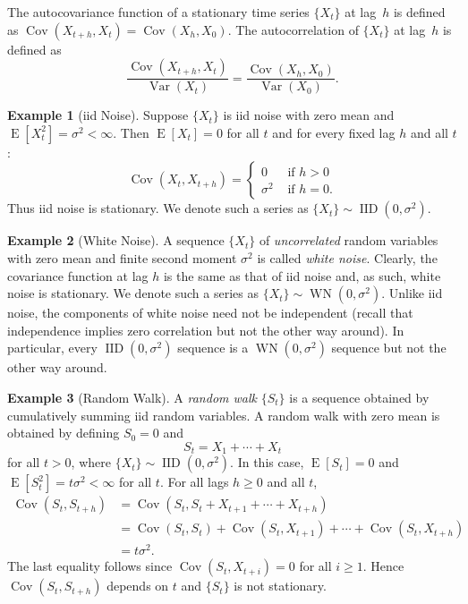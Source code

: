 \documentclass[11pt,a4]{article}
\DeclareMathOperator{\cov}{Cov}
\DeclareMathOperator{\E}{E}
\DeclareMathOperator{\var}{Var}
\DeclareMathOperator{\IID}{IID}
\DeclareMathOperator{\WN}{WN}
\theoremstyle{definition}
\newtheorem{example}{Example}
\begin{document}
The autocovariance function of a stationary time series $\{ X_t \}$ at lag~$h$
is defined as $\cov(X_{t + h}, X_{t}) = \cov(X_{h}, X_{0})$. The autocorrelation
of $\{ X_t \}$ at lag~$h$ is defined as 
\[
	\frac{ \cov(X_{t + h}, X_t) }{ \var(X_t) } = 
	\frac{ \cov( X_h, X_0 )}{ \var(X_0) }.
\]   

\begin{example}[iid Noise]
Suppose $\{ X_t \}$ is iid noise with zero mean and 
$\E [X_t^2] = \sigma^2 < \infty$. Then $\E [X_t] = 0$ for all $t$ and for every
fixed lag $h$ and all $t$:
\[\cov(X_t, X_{t + h}) = \left \{ 
                                \begin{array}{ll}
                                    0        & \text{ if } h > 0 \\
                                    \sigma^2 & \text{ if } h = 0.
                                \end{array}
                          \right . 
\]
Thus iid noise is stationary. We denote such a series as 
$\{ X_t \} \sim \IID (0, \sigma^2)$.
\end{example}

\begin{example}[White Noise]
A sequence $\{ X_t \}$ of \emph{uncorrelated} random variables with zero mean 
and finite second moment $\sigma^2$ is called \emph{white noise}. Clearly, the 
covariance function at lag $h$ is the same as that of iid noise and, as such, 
white noise is stationary. We denote such a series as
$\{ X_t \} \sim \WN (0, \sigma^2)$. Unlike iid noise, the 
components of white noise need not be independent (recall that independence 
implies zero correlation but not the other way around). In particular, every
$\IID (0, \sigma^2)$ sequence is a $\WN (0, \sigma^2)$ sequence 
but not the other way around. 
\end{example}

\begin{example}[Random Walk]
 A \emph{random walk} $\{ S_t \}$ is a sequence obtained by cumulatively summing 
iid random variables. A random walk with zero mean is obtained by defining 
$S_0 = 0$ and 
\[
    S_t = X_1 + \cdots + X_t
\]
for all $t > 0$, where $\{ X_t \} \sim \IID(0, \sigma^2)$. In this case, 
$\E [S_t] = 0$ and $\E [S_t^2] = t \sigma^2 < \infty$ for all $t$. For all lags 
$h \geq 0$ and all $t$,
\begin{align*}
    \cov (S_t, S_{t + h}) 
        & = \cov (S_t, S_t + X_{t + 1} + \cdots + X_{t + h}) \\
        & = \cov (S_t, S_t) + \cov (S_t, X_{t + 1}) + \cdots + \cov (S_t, X_{t + h}) \\
        & = t \sigma^2.  
\end{align*}
The last equality follows since $\cov (S_t, X_{t + i}) = 0$ for all $i \geq 1$.
Hence $\cov (S_t, S_{t + h})$ depends on $t$ and $\{ S_t \}$ is not stationary.
\end{example}
\end{document}
